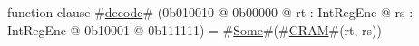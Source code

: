 function clause #\hyperref[zdecode]{decode}# (0b010010 @ 0b00000 @ rt : IntRegEnc @ rs : IntRegEnc @   0b10001 @ 0b111111) = #\hyperref[zSome]{Some}#(#\hyperref[zCRAM]{CRAM}#(rt, rs))
